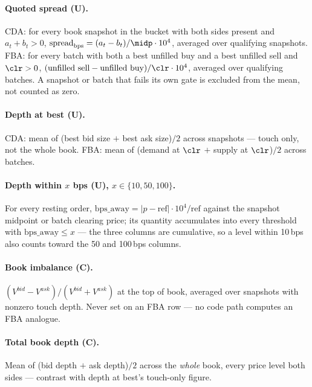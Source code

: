 \paragraph{Quoted spread (U).} CDA: for every book snapshot in the
bucket with both sides present and $a_t + b_t > 0$,
$\mathrm{spread}_{\mathrm{bps}} = (a_t - b_t)/\midp \cdot 10^{4}$,
averaged over qualifying snapshots. FBA: for every batch with both a
best unfilled buy and a best unfilled sell and $\clr > 0$,
$(\text{unfilled sell} - \text{unfilled buy})/\clr \cdot 10^{4}$,
averaged over qualifying batches. A snapshot or batch that fails its own
gate is excluded from the mean, not counted as zero.

\paragraph{Depth at best (U).} CDA: mean of (best bid size $+$ best ask
size)$/2$ across snapshots --- touch only, not the whole book. FBA: mean
of (demand at $\clr$ $+$ supply at $\clr$)$/2$ across batches.

\paragraph{Depth within $x$ bps (U), $x \in \{10, 50, 100\}$.} For every
resting order, $\mathrm{bps\_away} = |p - \mathrm{ref}| \cdot
10^{4}/\mathrm{ref}$ against the snapshot midpoint or batch clearing
price; its quantity accumulates into every threshold with
$\mathrm{bps\_away} \le x$ --- the three columns are cumulative, so a
level within 10\,bps also counts toward the 50 and 100\,bps columns.

\paragraph{Book imbalance (C).} $(V^{bid} - V^{ask})/(V^{bid}+V^{ask})$
at the top of book, averaged over snapshots with nonzero touch depth.
Never set on an FBA row --- no code path computes an FBA analogue.

\paragraph{Total book depth (C).} Mean of (bid depth $+$ ask
depth)$/2$ across the \emph{whole} book, every price level both sides
--- contrast with depth at best's touch-only figure.

